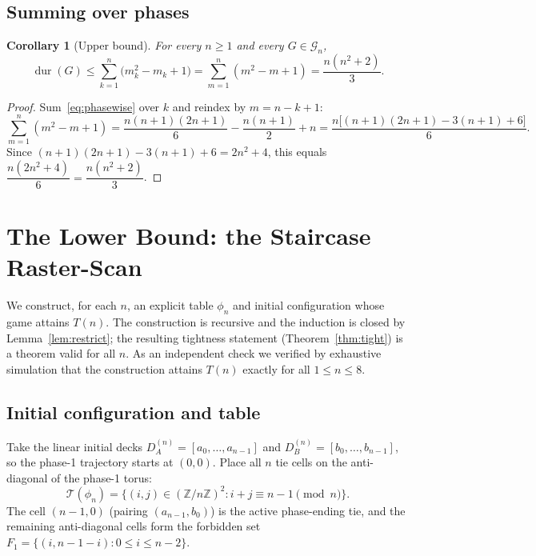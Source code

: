 \documentclass[11pt]{article}
\newtheorem{corollary}{Corollary}
\theoremstyle{definition}
\theoremstyle{remark}
\DeclareMathOperator{\dur}{dur}
\newcommand{\Z}{\mathbb{Z}}
\newcommand{\Tphi}{\mathcal{T}}
\begin{document}
\subsection{Summing over phases}
\begin{corollary}[Upper bound]\label{cor:upper}
For every $n \ge 1$ and every $G \in \mathcal G_n$,
\begin{equation}\label{eq:upper}
\dur(G) \le \sum_{k=1}^n \bigl(m_k^2 - m_k + 1\bigr) = \sum_{m=1}^n (m^2 - m + 1) = \frac{n(n^2 + 2)}{3}.
\end{equation}
\end{corollary}
\begin{proof}
Sum~\eqref{eq:phasewise} over $k$ and reindex by $m = n - k + 1$:
\[
\sum_{m=1}^n (m^2 - m + 1) = \frac{n(n+1)(2n+1)}{6} - \frac{n(n+1)}{2} + n
= \frac{n\bigl[(n+1)(2n+1) - 3(n+1) + 6\bigr]}{6}.
\]
Since $(n+1)(2n+1) - 3(n+1) + 6 = 2n^2 + 4$, this equals $\dfrac{n(2n^2 + 4)}{6} = \dfrac{n(n^2 + 2)}{3}$.
\end{proof}

\section{The Lower Bound: the Staircase Raster-Scan}\label{sec:lower}
We construct, for each $n$, an explicit table $\phi_n$ and initial configuration whose game attains $T(n)$. The
construction is recursive and the induction is closed by Lemma~\ref{lem:restrict}; the resulting tightness statement
(Theorem~\ref{thm:tight}) is a theorem valid for all $n$. As an independent check we verified by exhaustive
simulation that the construction attains $T(n)$ exactly for all $1 \le n \le 8$.

\subsection{Initial configuration and table}
Take the linear initial decks $D^{(n)}_A = [a_0, \dots, a_{n-1}]$ and $D^{(n)}_B = [b_0, \dots, b_{n-1}]$, so the phase-1
trajectory starts at $(0, 0)$. Place all $n$ tie cells on the anti-diagonal of the phase-1 torus:
\begin{equation}
\Tphi(\phi_n) = \bigl\{(i, j) \in (\Z/n\Z)^2 : i + j \equiv n - 1 \!\!\pmod n\bigr\}.
\end{equation}
The cell $(n-1, 0)$ (pairing $(a_{n-1}, b_0)$) is the active phase-ending tie, and the remaining anti-diagonal cells
form the forbidden set $F_1 = \{(i, n - 1 - i) : 0 \le i \le n - 2\}$.
\end{document}
